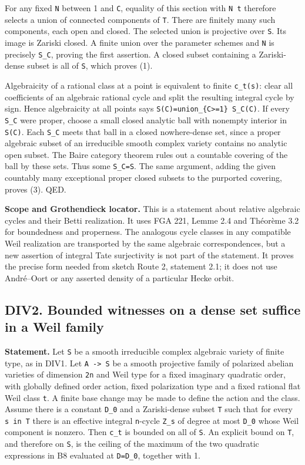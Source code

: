 \documentclass[11pt,a4paper]{article}
\theoremstyle{definition}
\begin{document}
For any fixed \texttt{N} between 1 and \texttt{C}, equality of this
section with \texttt{N\ t} therefore selects a union of connected
components of \texttt{T}. There are finitely many such components, each
open and closed. The selected union is projective over \texttt{S}. Its
image is Zariski closed. A finite union over the parameter schemes and
\texttt{N} is precisely \texttt{S\_C}, proving the first assertion. A
closed subset containing a Zariski-dense subset is all of \texttt{S},
which proves (1).

Algebraicity of a rational class at a point is equivalent to finite
\texttt{c\_t(s)}: clear all coefficients of an algebraic rational cycle
and split the resulting integral cycle by sign. Hence algebraicity at
all points says \texttt{S(C)=union\_\{C\textgreater{}=1\}\ S\_C(C)}. If
every \texttt{S\_C} were proper, choose a small closed analytic ball
with nonempty interior in \texttt{S(C)}. Each \texttt{S\_C} meets that
ball in a closed nowhere-dense set, since a proper algebraic subset of
an irreducible smooth complex variety contains no analytic open subset.
The Baire category theorem rules out a countable covering of the ball by
these sets. Thus some \texttt{S\_C=S}. The same argument, adding the
given countably many exceptional proper closed subsets to the purported
covering, proves (3). QED.

\textbf{Scope and Grothendieck locator.} This is a statement about
relative algebraic cycles and their Betti realization. It uses FGA 221,
Lemme 2.4 and Théorème 3.2 for boundedness and properness. The analogous
cycle classes in any compatible Weil realization are transported by the
same algebraic correspondences, but a new assertion of integral Tate
surjectivity is not part of the statement. It proves the precise form
needed from sketch Route 2, statement 2.1; it does not use André--Oort
or any asserted density of a particular Hecke orbit.

\subsection{DIV2. Bounded witnesses on a dense set suffice in a Weil
family}\label{div2.-bounded-witnesses-on-a-dense-set-suffice-in-a-weil-family}

\textbf{Statement.} Let \texttt{S} be a smooth irreducible complex
algebraic variety of finite type, as in DIV1. Let
\texttt{A\ -\textgreater{}\ S} be a smooth projective family of
polarized abelian varieties of dimension \texttt{2n} and Weil type for a
fixed imaginary quadratic order, with globally defined order action,
fixed polarization type and a fixed rational flat Weil class \texttt{t}.
A finite base change may be made to define the action and the class.
Assume there is a constant \texttt{D\_0} and a Zariski-dense subset
\texttt{T} such that for every \texttt{s\ in\ T} there is an effective
integral \texttt{n}-cycle \texttt{Z\_s} of degree at most \texttt{D\_0}
whose Weil component is nonzero. Then \texttt{c\_t} is bounded on all of
\texttt{S}. An explicit bound on \texttt{T}, and therefore on
\texttt{S}, is the ceiling of the maximum of the two quadratic
expressions in B8 evaluated at \texttt{D=D\_0}, together with 1.
\end{document}
